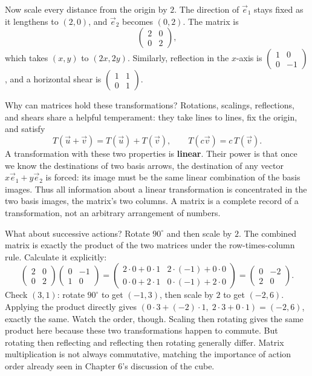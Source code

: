 Now scale every distance from the origin by $2$. The direction of $\vec{e}_1$ stays fixed as it lengthens to $(2,0)$, and $\vec{e}_2$ becomes $(0,2)$. The matrix is
\[
\begin{pmatrix}2&0\\0&2\end{pmatrix},
\]
which takes $(x,y)$ to $(2x,2y)$. Similarly, reflection in the $x$-axis is $\begin{pmatrix}1&0\\0&-1\end{pmatrix}$, and a horizontal shear is $\begin{pmatrix}1&1\\0&1\end{pmatrix}$.

Why can matrices hold these transformations? Rotations, scalings, reflections, and shears share a helpful temperament: they take lines to lines, fix the origin, and satisfy
\[
T(\vec{u}+\vec{v})=T(\vec{u})+T(\vec{v}),\qquad T(c\vec{v})=c\,T(\vec{v}).
\]
A transformation with these two properties is \textbf{linear}. Their power is that once we know the destinations of two basis arrows, the destination of any vector $x\vec{e}_1+y\vec{e}_2$ is forced: its image must be the same linear combination of the basis images. Thus all information about a linear transformation is concentrated in the two basis images, the matrix's two columns. A matrix is a complete record of a transformation, not an arbitrary arrangement of numbers.

What about successive actions? Rotate $90^\circ$ and then scale by $2$. The combined matrix is exactly the product of the two matrices under the row-times-column rule. Calculate it explicitly:
\[
\begin{pmatrix}2&0\\0&2\end{pmatrix}\begin{pmatrix}0&-1\\1&0\end{pmatrix}
=\begin{pmatrix}2\cdot0+0\cdot1&2\cdot(-1)+0\cdot0\\0\cdot0+2\cdot1&0\cdot(-1)+2\cdot0\end{pmatrix}
=\begin{pmatrix}0&-2\\2&0\end{pmatrix}.
\]
Check $(3,1)$: rotate $90^\circ$ to get $(-1,3)$, then scale by $2$ to get $(-2,6)$. Applying the product directly gives $(0\cdot3+(-2)\cdot1,\;2\cdot3+0\cdot1)=(-2,6)$, exactly the same. Watch the order, though. Scaling then rotating gives the same product here because these two transformations happen to commute. But rotating then reflecting and reflecting then rotating generally differ. Matrix multiplication is not always commutative, matching the importance of action order already seen in Chapter 6's discussion of the cube.


